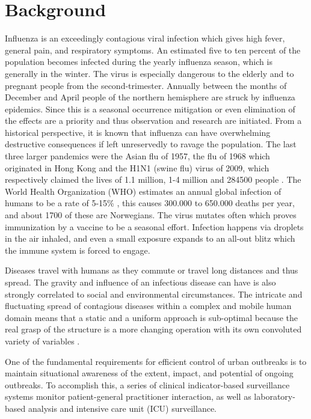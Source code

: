 \section{Background}
Influenza is an exceedingly contagious viral infection which gives high fever, general pain, and respiratory symptoms\cite{fhi_sykdommer}. An estimated five to ten percent of the population becomes infected during the yearly influenza season, which is generally in the winter. The virus is especially dangerous to the elderly and to pregnant people from the second-trimester. Annually between the months of December and April people of the northern hemisphere are struck by influenza epidemics. Since this is a seasonal occurrence mitigation or even elimination of the effects are a priority and thus observation and research are initiated. From a historical perspective, it is known that influenza can have overwhelming destructive consequences if left unreservedly to ravage the population. The last three larger pandemics were the Asian flu of 1957, the flu of 1968 which originated in Hong Kong and the H1N1 (swine flu) virus of 2009, which respectively claimed the lives of 1.1 million, 1-4 million and 284500 people \cite{world2005ten}. The World Health Organization (WHO) estimates an annual global infection of humans to be a rate of 5-15\% \cite{who2017}, this causes 300.000 to 650.000 deaths per year\cite{iuliano2017estimates}, and about 1700 of these are Norwegians\cite{niph}. The virus mutates often which proves immunization by a vaccine to be a seasonal effort. Infection happens via droplets in the air inhaled, and even a small exposure expands to an all-out blitz which the immune system is forced to engage.

Diseases travel with humans as they commute or travel long distances and thus spread\cite{poletto2013human}\cite{wibisono2008non}. The gravity and influence of an infectious disease can have is also strongly correlated to social\cite{yang2017characterizing} and environmental\cite{robertson2017towards} circumstances. The intricate and fluctuating spread of contagious diseases within a complex and mobile human domain means that a static and a uniform approach is sub-optimal because the real grasp of the structure is a more changing operation with its own convoluted variety of variables \cite{spatiotemp_urban_sys}\cite{enduri2018dynamics}.

One of the fundamental requirements for efficient control of urban outbreaks is to maintain situational awareness of the extent, impact, and potential of ongoing outbreaks. To accomplish this, a series of clinical indicator-based surveillance systems monitor patient-general practitioner interaction, as well as laboratory-based analysis and intensive care unit (ICU) surveillance. 



